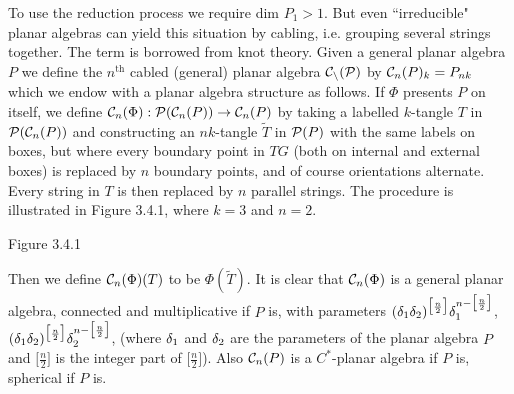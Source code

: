 \bs To use the reduction process we require dim $P_1 >1$. But even
``irreducible" planar
 algebras can yield this situation by cabling, i.e. grouping
several strings together. The term is borrowed from knot theory.
Given a general planar algebra $P$ we define the $n^{\text{th}}$
cabled (general) planar algebra $\cal C_n(P)$ by ${\cal C}_n(P)_k=P_{nk}$ 
which we endow with a planar algebra structure as
follows. If $\Phi$ presents $P$ on itself, we define
${\cal C}_n(\Phi):{\cal P}({\cal C}_n(P))\to{\cal C}_n(P)$ by taking a
labelled $k$-tangle $T$ in ${\cal P}({\cal C}_n(P))$ and constructing
an $nk$-tangle $\tilde T$ in ${\cal P}(P)$ with the same labels on
boxes, but where every boundary point in $TG$ (both on internal and
external boxes) is replaced by $n$ boundary points, and of course
orientations alternate. Every string in $T$ is then replaced by $n$
parallel strings. The procedure is illustrated in Figure 3.4.1,
where $k=3$ and $n=2$.
\[
        
\]
\begin{center}
Figure 3.4.1
\end{center}
\bs\ni Then we define ${\cal C}_n(\Phi)(T)$ to be $\Phi(\tilde T)$.
It is clear that ${\cal C}_n(\Phi)$ is a general planar algebra,
connected and multiplicative if $P$ is, with parameters
$(\delta_1\delta_2)^{\big[\frac n2\big]}\delta_1^{n-\big[\frac n2\big]}$,
$(\delta_1\delta_2)^{\big[\frac n2\big]}\delta_2^{n-\big[\frac n2\big]}$,
(where $\delta_1$ and $\delta_2$ are the parameters of the planar algebra
$P$ and $\big[\frac n2\big]$ is the  integer part of
$\big[\frac n2\big]$). Also ${\cal C}_n(P)$ is a $C^*$-planar algebra
if $P$ is, spherical if $P$ is.


\bs\bs{}

